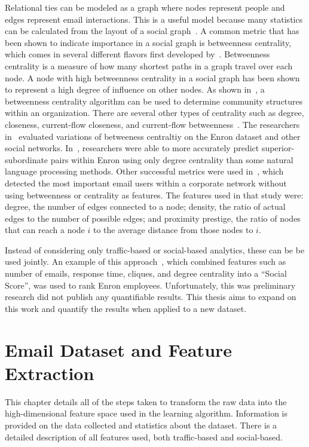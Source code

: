 \documentclass[12pt]{report}
\begin{document}
Relational ties can be modeled as a graph where nodes represent people and edges represent email interactions.
This is a useful model because many statistics can be calculated from the layout of a social graph~\cite{wasserman_social_1994}.
A common metric that has been shown to indicate importance in a social graph is betweenness centrality, which comes in several different flavors first developed by~\cite{freeman_set_1977}.
Betweenness centrality is a measure of how many shortest paths in a graph travel over each node.
A node with high betweenness centrality in a social graph has been shown to represent a high degree of influence on other nodes.
As shown in~\cite{tyler_email_2003}, a betweenness centrality algorithm can be used to determine community structures within an organization.
There are several other types of centrality such as degree, closeness, current-flow closeness, and current-flow betweenness~\cite{balinsky2011rapid}.
The researchers in~\cite{avrachenkov2013alpha} evaluated variations of betweeness centraltiy on the Enron dataset and other social networks.
In~\cite{agarwal_comprehensive_2012}, researchers were able to more accurately predict superior-subordinate pairs within Enron using only degree centrality than some natural language processing methods.
Other successful metrics were used in~\cite{wilson_discovery_2009}, which detected the most important email users within a corporate network without using betweenness or centrality as features.
The features used in that study were: degree, the number of edges connected to a node; density, the ratio of actual edges to the number of possible edges; and proximity prestige, the ratio of nodes that can reach a node $i$ to the average distance from those nodes to $i$.

Instead of considering only traffic-based or social-based analytics, these can be be used jointly.
An example of this approach~\cite{rowe_automated_2007}, which combined features such as number of emails, response time, cliques, and degree centrality into a ``Social Score'', was used to rank Enron employees.  
Unfortunately, this was preliminary research did not publish any quantifiable results.
This thesis aims to expand on this work and quantify the results when applied to a new dataset.

\chapter{Email Dataset and Feature Extraction} \label{Data}

This chapter details all of the steps taken to transform the raw data into the high-dimensional feature space used in the learning algorithm.
Information is provided on the data collected and statistics about the dataset.
There is a detailed description of all features used, both traffic-based and social-based.
\end{document}
